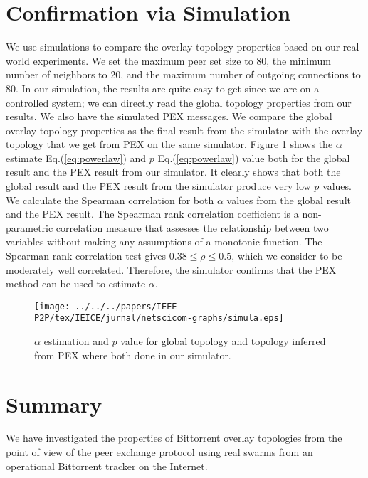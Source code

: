 \section{Confirmation via Simulation}\label{simulation}
We use simulations to compare the overlay topology properties based  on our real-world experiments. 
We set the maximum peer set size to 80, the minimum number of neighbors to 20, and the maximum number of outgoing connections to 80. 
In our simulation, the results are quite easy to get since we are on a controlled system;  we can directly read the  global topology properties from our results. 
We also have the simulated PEX messages. We compare the global overlay topology properties as the final result from the simulator with the overlay topology that we get from PEX on the same simulator.
Figure \ref{fig:simulation} shows the $\alpha$ estimate Eq.(\ref{eq:powerlaw}) and $p$ Eq.(\ref{eq:powerlaw}) value both for the global result and the PEX result from our simulator. 
It clearly shows that both the global result and the PEX result from the simulator produce very low $p$ values. 
We calculate the Spearman correlation for both $\alpha$ values from the global result and the PEX result. 
The Spearman rank correlation coefficient is a non-parametric correlation measure that assesses the relationship between two variables
without making any assumptions of a monotonic function.
The Spearman rank correlation test gives $0.38 \leq \rho \leq 0.5$, which we consider to be moderately well correlated. 
Therefore, the simulator confirms that the PEX method can be used to estimate $\alpha$.
\begin{figure}[!tb]
\begin{center}
\texttt{[image: ../../../papers/IEEE-P2P/tex/IEICE/jurnal/netscicom-graphs/simula.eps]}
\end{center}
\caption{$\alpha$ estimation and $p$ value for global topology and topology inferred from PEX where both done in our simulator.}
\label{fig:simulation}
\end{figure}


\section{Summary}\label{summary3}
We have investigated the properties of Bittorrent overlay topologies from the point of view of the peer exchange protocol using real swarms from an operational Bittorrent tracker on the Internet. 

